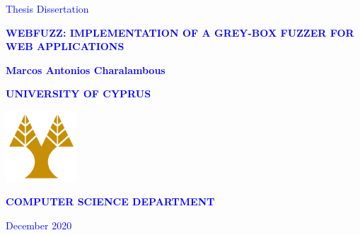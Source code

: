 \documentclass[12pt]{report}
\def\pname{webFuzz\xspace}
\def\ptitle{\pname: Implementation of a Grey-box Fuzzer for Web Applications}
\begin{document}
\begin{titlepage}
\begin{center}
\vspace*{1cm}

\textcolor{blue}{Thesis Dissertation}

\vspace*{2cm}

\textcolor{blue}{\Large{\textbf{\MakeUppercase{\ptitle{}}}}}

\vspace*{2cm}

\textcolor{blue}{\large{\textbf{Marcos Antonios Charalambous}}}

\vspace*{2cm}
\textcolor{blue}{\Large{\textbf{\MakeUppercase{University of Cyprus}}}}

\vspace*{2cm}

\includegraphics[width=0.2\textwidth]{ucy-logo.png}

\vspace*{2cm}

\textcolor{blue}{\Large{\textbf{\MakeUppercase{Computer Science Department}}}}

\vspace*{4cm}

\textcolor{blue}{\normalsize{December 2020}}
\end{center}
\end{titlepage}
\end{document}
